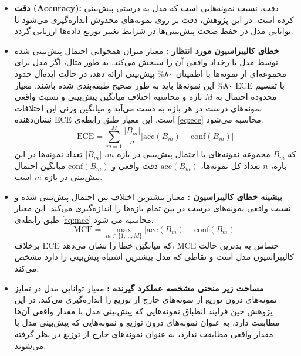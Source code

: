\begin{itemize}
	\item \textbf{دقت (Accuracy):} 
	دقت، نسبت نمونه‌هایی است که مدل به درستی پیش‌بینی کرده است. در این پژوهش، دقت بر روی نمونه‌های مخدوش اندازه‌گیری می‌شود تا توانایی مدل در حفظ صحت پیش‌بینی‌ها در شرایط تغییر توزیع داده‌ها ارزیابی گردد.
	
	\item \textbf{خطای کالیبراسیون مورد انتظار :} 
	معیار  میزان همخوانی احتمال پیش‌بینی شده توسط مدل با رخداد واقعی آن را سنجش می‌کند. به طور مثال، اگر مدل برای مجموعه‌ای از نمونه‌ها با اطمینان ۸۰\% پیش‌بینی ارائه دهد، در حالت ایده‌آل حدود ۸۰\% این نمونه‌ها باید به طور صحیح طبقه‌بندی شده باشند. 
	معیار ECE با تقسیم محدوده احتمال به $M$ بازه و محاسبه اختلاف میانگین پیش‌بینی و نسبت واقعی نمونه‌های درست در هر بازه به دست می‌آید و میانگین وزنی این اختلافات نشان‌دهنده ECE است. این معیار طبق رابطه‌ی  \ref{eq:ece} محاسبه می‌شود.
	\begin{equation}
		\label{eq:ece}
		\text{ECE} = \sum_{m=1}^{M} \frac{|B_m|}{n} \big| \text{acc}(B_m) - \text{conf}(B_m) \big|
	\end{equation}
	که $B_m$ مجموعه نمونه‌های با احتمال پیش‌بینی در بازه $m$، $|B_m|$ تعداد نمونه‌ها در این بازه، $n$ تعداد کل نمونه‌ها، $\text{acc}(B_m)$ دقت واقعی و $\text{conf}(B_m)$ میانگین احتمال پیش‌بینی در بازه $m$ است.
	
	\item \textbf{بیشینه خطای کالیبراسیون :} 
	معیار  بیشترین اختلاف بین احتمال پیش‌بینی شده و نسبت واقعی نمونه‌های درست در بین تمام بازه‌ها را اندازه‌گیری می‌کند. این معیار طبق رابطه‌ی \ref{eq:mce} محاسبه می شود.
	\begin{equation}
		\label{eq:mce}
		\text{MCE} = \max_{m \in \{1,\dots,M\}} \big| \text{acc}(B_m) - \text{conf}(B_m) \big|
	\end{equation}
	برخلاف ECE که میانگین خطا را نشان می‌دهد، MCE حساس به بدترین حالت کالیبراسیون مدل است و نقاطی که مدل بیشترین اشتباه پیش‌بینی را دارد مشخص می‌کند.
	
	\item \textbf{مساحت زیر منحنی مشخصه عملکرد گیرنده :} 
	معیار  توانایی مدل در تمایز نمونه‌های درون توزیع از نمونه‌های خارج از توزیع را اندازه‌گیری می‌کند. در این پژوهش حین فرایند انطباق نمونه‌هایی که پیش‌بینی مدل با مقدار واقعی آن‌ها مطابقت دارد، به عنوان نمونه‌های درون توزیع و نمونه‌هایی که پیش‌بینی مدل با مقدار واقعی مطابقت ندارد، به عنوان نمونه‌های خارج از توزیع در نظر گرفته می‌شوند.
	

\end{itemize}
